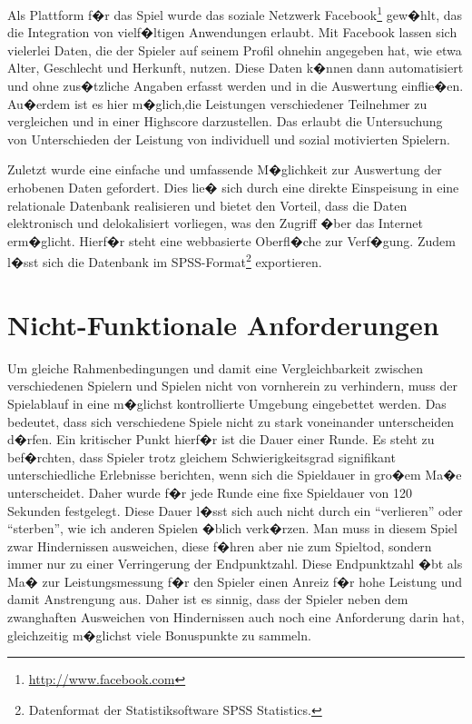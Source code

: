 \documentclass[a4paper,12pt]{scrartcl}
\begin{document}
Als Plattform f�r das Spiel wurde das soziale Netzwerk Facebook\footnote{\url{http://www.facebook.com}} gew�hlt, das die
Integration von vielf�ltigen Anwendungen erlaubt. Mit Facebook lassen sich vielerlei Daten,
die der Spieler auf seinem Profil ohnehin angegeben hat, wie etwa Alter, Geschlecht und
Herkunft, nutzen. Diese Daten k�nnen dann automatisiert und ohne zus�tzliche Angaben
erfasst werden und in die Auswertung einflie�en.\newline
Au�erdem ist es hier m�glich,die Leistungen verschiedener Teilnehmer zu vergleichen
und in einer Highscore darzustellen. Das erlaubt die Untersuchung von Unterschieden der
Leistung von individuell und sozial motivierten Spielern.

Zuletzt wurde eine einfache und umfassende M�glichkeit zur Auswertung der erhobenen Daten gefordert.
Dies lie� sich durch eine direkte Einspeisung in eine relationale Datenbank realisieren und bietet den Vorteil, dass die Daten elektronisch und delokalisiert vorliegen, was den Zugriff �ber das Internet erm�glicht. Hierf�r steht eine webbasierte Oberfl�che zur Verf�gung. Zudem l�sst sich die Datenbank im SPSS-Format\footnote{Datenformat der Statistiksoftware SPSS Statistics.} exportieren.

\section{Nicht-Funktionale Anforderungen}
Um gleiche Rahmenbedingungen und damit eine Vergleichbarkeit zwischen verschiedenen
Spielern und Spielen nicht von vornherein zu verhindern, muss der Spielablauf in
eine m�glichst kontrollierte Umgebung eingebettet werden. Das bedeutet, dass sich
verschiedene Spiele nicht zu stark voneinander unterscheiden d�rfen. Ein kritischer Punkt
hierf�r ist die Dauer einer Runde. Es steht zu bef�rchten, dass Spieler trotz gleichem
Schwierigkeitsgrad signifikant unterschiedliche Erlebnisse berichten, wenn sich die
Spieldauer in gro�em Ma�e unterscheidet. Daher wurde f�r jede Runde eine fixe Spieldauer
von 120 Sekunden festgelegt. Diese Dauer l�sst sich auch nicht durch ein "`verlieren"'
oder "`sterben"', wie ich anderen Spielen �blich verk�rzen. Man muss in diesem Spiel zwar
Hindernissen ausweichen, diese f�hren aber nie zum Spieltod, sondern immer nur zu einer
Verringerung der Endpunktzahl. Diese Endpunktzahl �bt als Ma� zur Leistungsmessung f�r
den Spieler einen Anreiz f�r hohe Leistung und damit Anstrengung aus. Daher ist es
sinnig, dass der Spieler neben dem zwanghaften Ausweichen von Hindernissen auch noch
eine Anforderung darin hat, gleichzeitig m�glichst viele Bonuspunkte zu sammeln.
\end{document}
